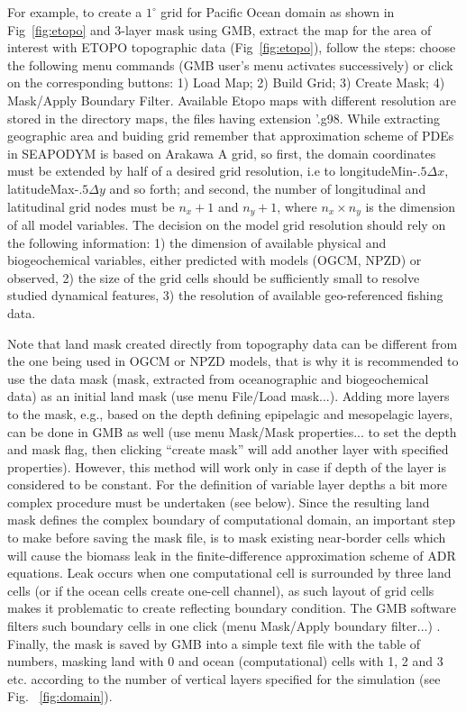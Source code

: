 For example, to create a $1^{\circ}$ grid for Pacific Ocean domain as shown in Fig~\ref{fig:etopo} and 3-layer mask using GMB, extract the map for the area of interest with ETOPO topographic data (Fig~\ref{fig:etopo}), follow the steps: choose the following menu commands (GMB user's menu activates successively) or click on the corresponding buttons: 1) Load Map; 2) Build Grid; 3) Create Mask; 4) Mask/Apply Boundary Filter. Available Etopo maps with different resolution are stored in the directory {\ttfamily maps}, the files having extension {'\ttfamily .g98}. While extracting geographic area and buiding grid remember that approximation scheme of PDEs in SEAPODYM is based on Arakawa A grid, so first, the domain coordinates must be extended by half of a desired grid resolution, i.e to  {\ttfamily longitudeMin}-$.5\Delta x$, {\ttfamily latitudeMax}-$.5\Delta y$ and so forth; and second, the number of longitudinal and latitudinal grid nodes must be $n_x+1$ and $n_y+1$, where $n_x \times n_y$ is the dimension of all model variables. The decision on the model grid resolution should rely on the following information: 1) the dimension of available physical and biogeochemical variables, either predicted with models (OGCM, NPZD) or observed,  2) the size of the grid cells should be sufficiently small to resolve studied dynamical features, 3) the resolution of available geo-referenced fishing data.

Note that land mask created directly from topography data can be different from the one being used in OGCM or NPZD models, that is why it is recommended to use the data mask (mask, extracted from oceanographic and biogeochemical data) as an initial land mask (use menu {\ttfamily File/Load mask...}). Adding  more layers to the mask, e.g., based on the depth defining epipelagic and mesopelagic layers,  can be done in GMB as well (use menu {\ttfamily Mask/Mask properties...} to set the depth and mask flag, then clicking "`create mask"' will add another layer with specified properties). However, this method will work only in case if depth of the layer is considered to be constant. For the definition of variable layer depths a bit more complex procedure must be undertaken (see below). Since the resulting land mask defines the complex boundary of computational domain, an important step to make before saving the mask file, is to mask existing near-border cells which will cause the biomass leak in the finite-difference approximation scheme of ADR equations. Leak occurs when one computational cell is surrounded by three land cells (or if the ocean cells create one-cell channel), as such layout of grid cells makes it problematic to create reflecting boundary condition. The GMB software filters such boundary cells in one click (menu {\ttfamily Mask/Apply boundary filter...}) . Finally, the mask is saved by GMB into a simple text file with the table of numbers, masking land with 0 and ocean (computational) cells with 1, 2 and 3 etc. according to the number of vertical layers specified for the simulation (see Fig. ~\ref{fig:domain}). \\

